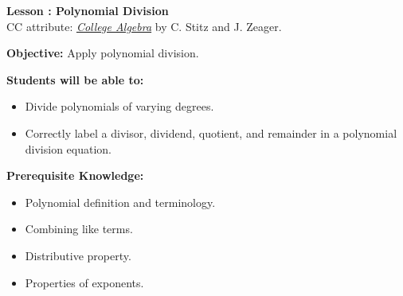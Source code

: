 \documentclass[12pt]{article}
\theoremstyle{definition}
\begin{document}
{\bf \large Lesson : Polynomial Division}
\\ CC attribute: \href{http://www.stitz-zeager.com}{\it{College Algebra}} by C. Stitz and J. Zeager. 
\hfill \doclicenseImage[imagewidth=5em]\\
\par
{\bf Objective:} Apply polynomial division.\\
\par
{\bf Students will be able to:}
\begin{itemize}
	\item Divide polynomials of varying degrees.  
	\item Correctly label a divisor, dividend, quotient, and remainder in a polynomial division equation.
\end{itemize}
{\bf Prerequisite Knowledge:}
\begin{itemize}
	\item Polynomial definition and terminology.
	\item Combining like terms.
	\item Distributive property.
	\item Properties of exponents.
\end{itemize}
\hrulefill
\end{document}
